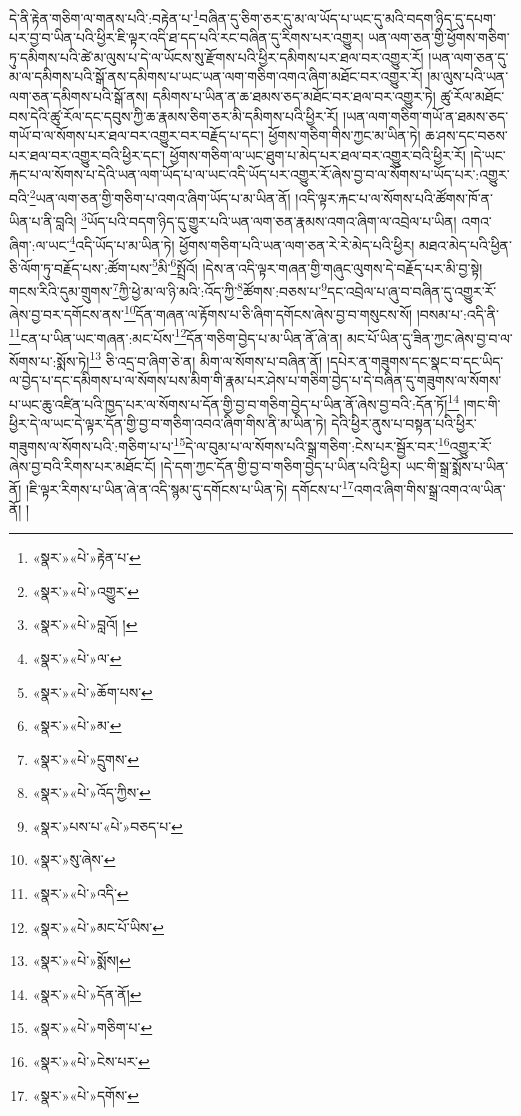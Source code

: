 དེ་ནི་རྟེན་གཅིག་ལ་གནས་པའི་:བརྟེན་པ་\footnote{«སྣར་»«པེ་»རྟེན་པ་}བཞིན་དུ་ཅིག་ཅར་དུ་མ་ལ་ཡོད་པ་ཡང་དུ་མའི་བདག་ཉིད་དུ་དཔག་པར་བྱ་བ་ཡིན་པའི་ཕྱིར་ཇི་ལྟར་འདི་ཐ་དད་པའི་རང་བཞིན་དུ་རིགས་པར་འགྱུར། ཡན་ལག་ཅན་གྱི་ཕྱོགས་གཅིག་ཏུ་དམིགས་པའི་ཚེ་མ་ལུས་པ་དེ་ལ་ཡོངས་སུ་རྫོགས་པའི་ཕྱིར་དམིགས་པར་ཐལ་བར་འགྱུར་རོ། །ཡན་ལག་ཅན་དུ་མ་ལ་དམིགས་པའི་སྒོ་ནས་དམིགས་པ་ཡང་ཡན་ལག་གཅིག་འགའ་ཞིག་མཐོང་བར་འགྱུར་རོ། །མ་ལུས་པའི་ཡན་ལག་ཅན་དམིགས་པའི་སྒོ་ནས། དམིགས་པ་ཡིན་ན་ཆ་ཐམས་ཅད་མཐོང་བར་ཐལ་བར་འགྱུར་ཏེ། ཚུ་རོལ་མཐོང་བས་དེའི་ཚུ་རོལ་དང་དབུས་ཀྱི་ཆ་རྣམས་ཅིག་ཅར་མི་དམིགས་པའི་ཕྱིར་རོ། །ཡན་ལག་གཅིག་གཡོ་ན་ཐམས་ཅད་གཡོ་བ་ལ་སོགས་པར་ཐལ་བར་འགྱུར་བར་བརྗོད་པ་དང་། ཕྱོགས་གཅིག་གིས་ཀྱང་མ་ཡིན་ཏེ། ཆ་ཤས་དང་བཅས་པར་ཐལ་བར་འགྱུར་བའི་ཕྱིར་དང་། ཕྱོགས་གཅིག་ལ་ཡང་ཐུག་པ་མེད་པར་ཐལ་བར་འགྱུར་བའི་ཕྱིར་རོ། །དེ་ཡང་རྐང་པ་ལ་སོགས་པ་དེའི་ཡན་ལག་ཡོད་པ་ལ་ཡང་འདི་ཡོད་པར་འགྱུར་རོ་ཞེས་བྱ་བ་ལ་སོགས་པ་ཡོད་པར་:འགྱུར་བའི་\footnote{«སྣར་»«པེ་»འགྱུར་}ཡན་ལག་ཅན་གྱི་གཅིག་པ་འགའ་ཞིག་ཡོད་པ་མ་ཡིན་ནོ། །འདི་ལྟར་རྐང་པ་ལ་སོགས་པའི་ཚོགས་ཁོ་ན་ཡིན་པ་ནི་བླའི། \footnote{«སྣར་»«པེ་»བླའོ། ། }ཡོད་པའི་བདག་ཉིད་དུ་གྱུར་པའི་ཡན་ལག་ཅན་རྣམས་འགའ་ཞིག་ལ་འབྲེལ་པ་ཡིན། འགའ་ཞིག་:ལ་ཡང་\footnote{«སྣར་»«པེ་»ལ་}འདི་ཡོད་པ་མ་ཡིན་ཏེ། ཕྱོགས་གཅིག་པའི་ཡན་ལག་ཅན་རེ་རེ་མེད་པའི་ཕྱིར། མཐའ་མེད་པའི་ཕྱིན་ཅི་ལོག་ཏུ་བརྗོད་པས་:ཚོག་པས་\footnote{«སྣར་»«པེ་»ཆོག་པས་}མི་\footnote{«སྣར་»«པེ་»མ་}སྤྲོའོ། །དེས་ན་འདི་ལྟར་གཞན་གྱི་གཞུང་ལུགས་དེ་བརྗོད་པར་མི་བྱ་སྟེ། གངས་རིའི་དུམ་གྲུགས་\footnote{«སྣར་»«པེ་»དྲུགས་}ཀྱི་ཕྱེ་མ་ལ་ཉི་མའི་:འོད་ཀྱི་\footnote{«སྣར་»«པེ་»འོད་ཀྱིས་}ཚོགས་:བཅས་པ་\footnote{«སྣར་»པས་པ་«པེ་»བཅད་པ་}དང་འབྲེལ་པ་ཞུ་བ་བཞིན་དུ་འགྱུར་རོ་ཞེས་བྱ་བར་དགོངས་ནས་\footnote{«སྣར་»སུ་ཞེས་}དོན་གཞན་ལ་རྟོགས་པ་ཅི་ཞིག་དགོངས་ཞེས་བྱ་བ་གསུངས་སོ། །བསམ་པ་:འདི་ནི་\footnote{«སྣར་»«པེ་»འདི་}ངན་པ་ཡིན་ཡང་གཞན་:མང་པོས་\footnote{«སྣར་»«པེ་»མང་པོ་ཡིས་}དོན་གཅིག་བྱེད་པ་མ་ཡིན་ནོ་ཞེ་ན། མང་པོ་ཡིན་དུ་ཟིན་ཀྱང་ཞེས་བྱ་བ་ལ་སོགས་པ་:སྨོས་ཏེ།\footnote{«སྣར་»«པེ་»སྨོས།} ཅི་འདྲ་བ་ཞིག་ཅེ་ན། མིག་ལ་སོགས་པ་བཞིན་ནོ། །དཔེར་ན་གཟུགས་དང་སྣང་བ་དང་ཡིད་ལ་བྱེད་པ་དང་དམིགས་པ་ལ་སོགས་པས་མིག་གི་རྣམ་པར་ཤེས་པ་གཅིག་བྱེད་པ་དེ་བཞིན་དུ་གཟུགས་ལ་སོགས་པ་ཡང་ཆུ་འཛིན་པའི་ཁྱད་པར་ལ་སོགས་པ་དོན་གྱི་བྱ་བ་གཅིག་བྱེད་པ་ཡིན་ནོ་ཞེས་བྱ་བའི་:དོན་ཏོ།\footnote{«སྣར་»«པེ་»དོན་ནོ།} །གང་གི་ཕྱིར་དེ་ལ་ཡང་དེ་ལྟར་དོན་གྱི་བྱ་བ་གཅིག་འབའ་ཞིག་གིས་ནི་མ་ཡིན་ཏེ། དེའི་ཕྱིར་ནུས་པ་བསྟན་པའི་ཕྱིར་གཟུགས་ལ་སོགས་པའི་:གཅིག་པ་པ་\footnote{«སྣར་»«པེ་»གཅིག་པ་}དེ་ལ་བུམ་པ་ལ་སོགས་པའི་སྒྲ་གཅིག་:ངེས་པར་སྦྱོར་བར་\footnote{«སྣར་»«པེ་»ངེས་པར་}འགྱུར་རོ་ཞེས་བྱ་བའི་རིགས་པར་མཐོང་ངོ། །དེ་དག་ཀྱང་དོན་གྱི་བྱ་བ་གཅིག་བྱེད་པ་ཡིན་པའི་ཕྱིར། ཡང་གི་སྒྲ་སྨོས་པ་ཡིན་ནོ། །ཇི་ལྟར་རིགས་པ་ཡིན་ཞེ་ན་འདི་སྙམ་དུ་དགོངས་པ་ཡིན་ཏེ། དགོངས་པ་\footnote{«སྣར་»«པེ་»དགོས་}འགའ་ཞིག་གིས་སྒྲ་འགའ་ལ་ཡིན་ནོ། །
